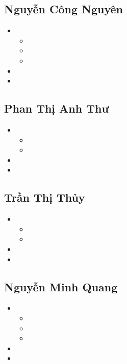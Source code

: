 \subsection{Nguyễn Công Nguyên}
\begin{itemize}
    \item 
    \begin{itemize}
        \item
        \item 
        \item 
    \end{itemize}
    \item
    \item 
\end{itemize}
\subsection{Phan Thị Anh Thư}
\begin{itemize}
    \item 
    \begin{itemize}
        \item
        \item 
    \end{itemize}
    \item
    \item 
\end{itemize}

\subsection{Trần Thị Thủy}
\begin{itemize}
    \item 
    \begin{itemize}
        \item
        \item
    \end{itemize}
    \item 
    \item
\end{itemize}

\subsection{Nguyễn Minh Quang}
\begin{itemize}
    \item
    \begin{itemize}
        \item 
        \item 
        \item 
    \end{itemize}
    \item 
    \item 
\end{itemize}


